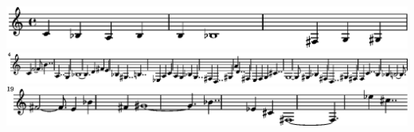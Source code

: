 \includegraphics{png-06-07-2020-09-41-27-1}%
\ifx\betweenLilyPondSystem \undefined
  \linebreak
\else
  \expandafter{}%
\fi
\includegraphics{png-06-07-2020-09-41-27-2}%
\ifx\betweenLilyPondSystem \undefined
  \linebreak
\else
  \expandafter{}%
\fi
\includegraphics{png-06-07-2020-09-41-27-3}%
